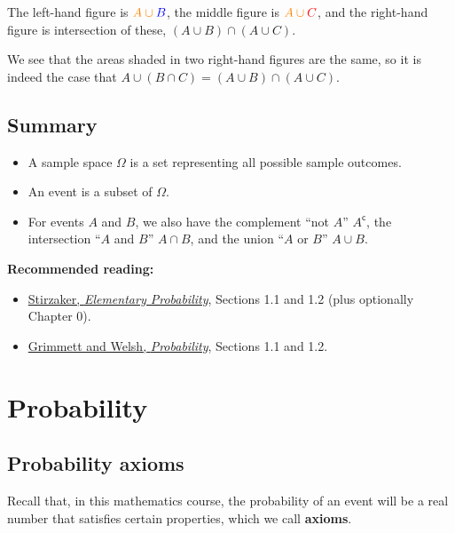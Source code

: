 \documentclass[
  a4paper,
]{book}
\providecommand{\tightlist}{%
  \setlength{\itemsep}{0pt}\setlength{\parskip}{0pt}}
\theoremstyle{definition}
\theoremstyle{definition}
\theoremstyle{definition}
\theoremstyle{definition}
\theoremstyle{remark}
\begin{document}
The left-hand figure is \(\color{orange}{A} \cup \color{blue}{B}\), the middle figure is \(\color{orange}{A}\cup \color{red}{C}\), and the right-hand figure is intersection of these, \((A\cup B)\cap (A\cup C)\).

We see that the areas shaded in two right-hand figures are the same, so it is indeed the case that
\(A\cup (B\cap C) = (A\cup B)\cap (A\cup C)\).

\hypertarget{summary-L03}{%
\section*{Summary}\label{summary-L03}}

\begin{itemize}
\tightlist
\item
  A sample space \(\Omega\) is a set representing all possible sample outcomes.
\item
  An event is a subset of \(\Omega\).
\item
  For events \(A\) and \(B\), we also have the complement ``not \(A\)'' \(A^\mathsf{c}\), the intersection ``\(A\) and \(B\)'' \(A \cap B\), and the union ``\(A\) or \(B\)'' \(A \cup B\).
\end{itemize}

\textbf{Recommended reading:}

\begin{itemize}
\tightlist
\item
  \href{https://leeds.primo.exlibrisgroup.com/permalink/44LEE_INST/13rlbcs/alma991013131349705181}{Stirzaker, \emph{Elementary Probability}}, Sections 1.1 and 1.2 (plus optionally Chapter 0).
\item
  \href{https://leeds.primo.exlibrisgroup.com/permalink/44LEE_INST/13rlbcs/alma991002938669705181}{Grimmett and Welsh, \emph{Probability}}, Sections 1.1 and 1.2.
\end{itemize}

\hypertarget{L04-probability}{%
\chapter{Probability}\label{L04-probability}}

\hypertarget{axioms}{%
\section{Probability axioms}\label{axioms}}

Recall that, in this mathematics course, the probability of an event will be a real number that satisfies certain properties, which we call \textbf{axioms}.
\end{document}
